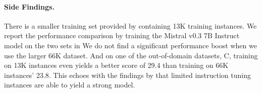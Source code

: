 \documentclass[11pt]{article}
\begin{document}


\paragraph{Side Findings.}
There is a smaller training set provided by \citet{li2023table} containing 13K training instances.
We report the performance comparison by training the Mistral v0.3 7B Instruct model on the two sets in 
We do not find a significant performance boost when we use the larger 66K dataset.
And on one of the out-of-domain datasets, C, training on 13K instances even yields a better score of 29.4 than training on 66K instances' 23.8.
This echoes with the findings by \citet{zhou2024lima} that limited instruction tuning instances are able to yield a strong model.
\end{document}
